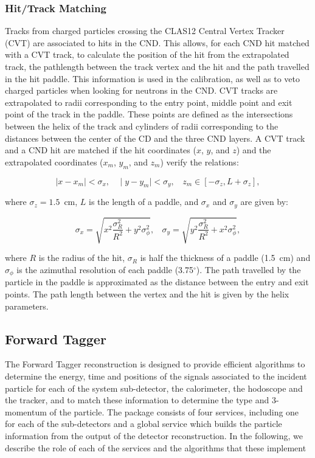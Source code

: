 \documentclass[3p,times,twocolumn]{elsarticle}
\begin{document}
\subsubsection{Hit/Track Matching}

Tracks from charged particles crossing the CLAS12 Central Vertex Tracker (CVT) are associated to hits in
the CND. This allows, for each CND hit matched with a CVT track, to calculate the position of the hit from the
extrapolated track, the pathlength between the track vertex and the hit and the path travelled in the hit
paddle. This information is used in the calibration, as well as to veto charged particles when looking for neutrons
in the CND. CVT tracks are extrapolated to radii corresponding to the entry point, middle point and exit point of
the track in the paddle. These points are defined as the intersections between the helix of the track and cylinders
of radii corresponding to the distances between the center of the CD and the three CND layers. A CVT track and
a CND hit are matched if the hit coordinates ($x$, $y$, and $z$) and the extrapolated coordinates ($x_m$,
$y_m$, and $z_m$) verify the relations:

\begin{equation}
\mid x-x_m \mid < \sigma_x ,~~~~\mid y-y_m \mid < \sigma_y , ~~~~z_m  \in [-\sigma_z,L+\sigma_z],
\end{equation}

\noindent

where $\sigma_z=1.5$~cm, $ L$ is the length of a paddle, and $\sigma_x$ and $\sigma_y$ are given by:

\begin{equation}
\sigma_x= \sqrt{x^2\frac{\sigma_R^2}{R^2}+y^2\sigma_\phi^2},~~~~
\sigma_y= \sqrt{y^2\frac{\sigma_R^2}{R^2}+x^2\sigma_\phi^2},
\end{equation}

\noindent
where $R$ is the radius of the hit, $\sigma_R$ is half the thickness of a paddle (1.5~cm) and $\sigma_\phi$
is the azimuthal resolution of each paddle (3.75$^\circ$). The path travelled by the particle in the paddle is
approximated as the distance between the entry and exit points. The path length between the vertex and the
hit is given by the helix parameters.

\subsection{Forward Tagger}
The Forward Tagger reconstruction is designed to provide efficient algorithms to determine the energy, time and positions of the signals associated to the incident particle for each of the system sub-detector, the calorimeter, the hodoscope and the tracker, and to match these information to determine the type and 3-momentum of the particle. The package consists of four services, including one for each of the sub-detectors and a global service which builds the particle information from the output of the detector reconstruction. In the following, we describe the role of each of the services and the algorithms that these implement
\end{document}
